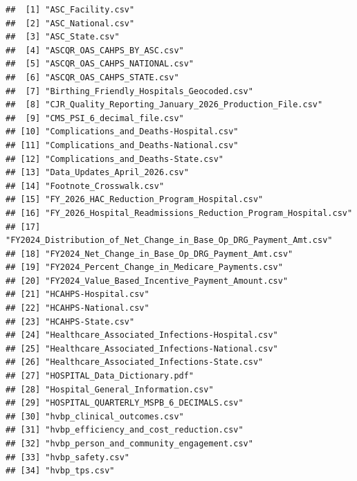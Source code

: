 \documentclass[
]{article}
\begin{document}
\begin{verbatim}
##  [1] "ASC_Facility.csv"                                                
##  [2] "ASC_National.csv"                                                
##  [3] "ASC_State.csv"                                                   
##  [4] "ASCQR_OAS_CAHPS_BY_ASC.csv"                                      
##  [5] "ASCQR_OAS_CAHPS_NATIONAL.csv"                                    
##  [6] "ASCQR_OAS_CAHPS_STATE.csv"                                       
##  [7] "Birthing_Friendly_Hospitals_Geocoded.csv"                        
##  [8] "CJR_Quality_Reporting_January_2026_Production_File.csv"          
##  [9] "CMS_PSI_6_decimal_file.csv"                                      
## [10] "Complications_and_Deaths-Hospital.csv"                           
## [11] "Complications_and_Deaths-National.csv"                           
## [12] "Complications_and_Deaths-State.csv"                              
## [13] "Data_Updates_April_2026.csv"                                     
## [14] "Footnote_Crosswalk.csv"                                          
## [15] "FY_2026_HAC_Reduction_Program_Hospital.csv"                      
## [16] "FY_2026_Hospital_Readmissions_Reduction_Program_Hospital.csv"    
## [17] "FY2024_Distribution_of_Net_Change_in_Base_Op_DRG_Payment_Amt.csv"
## [18] "FY2024_Net_Change_in_Base_Op_DRG_Payment_Amt.csv"                
## [19] "FY2024_Percent_Change_in_Medicare_Payments.csv"                  
## [20] "FY2024_Value_Based_Incentive_Payment_Amount.csv"                 
## [21] "HCAHPS-Hospital.csv"                                             
## [22] "HCAHPS-National.csv"                                             
## [23] "HCAHPS-State.csv"                                                
## [24] "Healthcare_Associated_Infections-Hospital.csv"                   
## [25] "Healthcare_Associated_Infections-National.csv"                   
## [26] "Healthcare_Associated_Infections-State.csv"                      
## [27] "HOSPITAL_Data_Dictionary.pdf"                                    
## [28] "Hospital_General_Information.csv"                                
## [29] "HOSPITAL_QUARTERLY_MSPB_6_DECIMALS.csv"                          
## [30] "hvbp_clinical_outcomes.csv"                                      
## [31] "hvbp_efficiency_and_cost_reduction.csv"                          
## [32] "hvbp_person_and_community_engagement.csv"                        
## [33] "hvbp_safety.csv"                                                 
## [34] "hvbp_tps.csv"                                                    

\end{verbatim}
\end{document}
